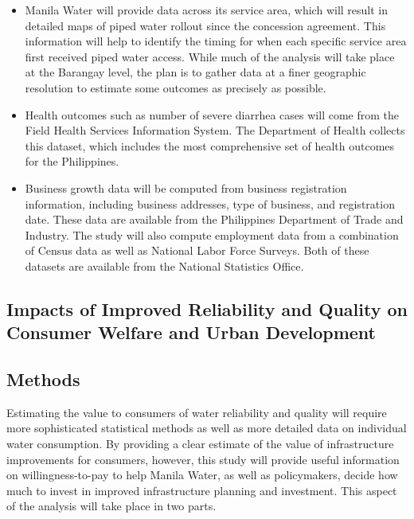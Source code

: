 \documentclass{article}
\begin{document}
\begin{itemize}
\item Manila Water will provide data across its service area, which will result in detailed maps of piped water rollout since the concession agreement.  This information will help to identify the timing for when each specific service area first received piped water access.  While much of the analysis will take place at the Barangay level, the plan is to gather data at a finer geographic resolution to estimate some outcomes as precisely as possible.
\item Health outcomes such as number of severe diarrhea cases will come from the Field Health Services Information System.  The Department of Health collects this dataset, which includes the most comprehensive set of health outcomes for the Philippines.
\item Business growth data will be computed from business registration information, including business addresses, type of business, and registration date.  These data are available from the Philippines Department of Trade and Industry.  The study will also compute employment data from a combination of Census data as well as National Labor Force Surveys.  Both of these datasets are available from the National Statistics Office.
\end{itemize}

\subsection{Impacts of Improved Reliability and Quality on Consumer Welfare and Urban Development}

\subsection*{Methods}

Estimating the value to consumers of water reliability and quality will require more sophisticated statistical methods as well as more detailed data on individual water consumption.  By providing a clear estimate of the value of infrastructure improvements for consumers, however, this study will provide useful information on willingness-to-pay to help Manila Water, as well as policymakers, decide how much to invest in improved infrastructure planning and investment.  This aspect of the analysis will take place in two parts.
\end{document}
